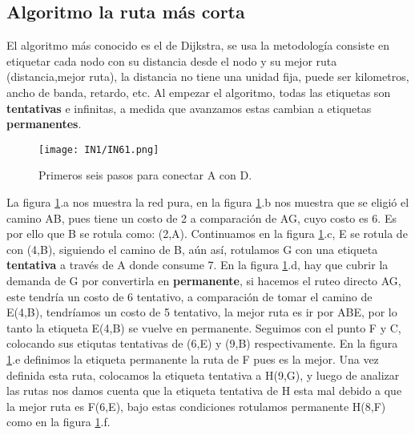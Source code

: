 \documentclass[
	12pt, %
	fleqn, %
	a4paper, %
]{LegrandOrangeBook}
\begin{document}
\subsection{Algoritmo la ruta más corta}
El algoritmo más conocido es el de Dijkstra, se usa la metodología consiste en etiquetar cada nodo con su distancia desde el nodo y su mejor ruta (distancia,mejor ruta), la distancia no tiene una unidad fija, puede ser kilometros, ancho de banda, retardo, etc. Al empezar el algoritmo, todas las etiquetas son \textbf{tentativas} e infinitas, a medida que avanzamos estas cambian a etiquetas \textbf{permanentes}.
\begin{figure}[H]
\centering
\texttt{[image: IN1/IN61.png]}
\caption{Primeros seis pasos para conectar A con D.}
\label{fig:algo dij}
\end{figure}
La figura \ref{fig:algo dij}.a nos muestra la red pura, en la figura \ref{fig:algo dij}.b nos muestra que se eligió el camino AB, pues tiene un costo de 2 a comparación de AG, cuyo costo es 6. Es por ello que B se rotula como: (2,A). Continuamos en la figura \ref{fig:algo dij}.c, E se rotula de con (4,B), siguiendo el camino de B, aún así, rotulamos G con una etiqueta \textbf{tentativa} a través de A donde consume 7. En la figura \ref{fig:algo dij}.d, hay que cubrir la demanda de G por convertirla en \textbf{permanente}, si hacemos el ruteo directo AG, este tendría un costo de 6 tentativo, a comparación de tomar el camino de E(4,B), tendríamos un costo de 5 tentativo, la mejor ruta es ir por ABE, por lo tanto la etiqueta E(4,B) se vuelve en permanente. Seguimos con el punto F y C, colocando sus etiqutas tentativas de (6,E) y (9,B) respectivamente. En la figura \ref{fig:algo dij}.e definimos la etiqueta permanente la ruta de F pues es la mejor. Una vez definida esta ruta, colocamos la etiqueta tentativa a H(9,G), y luego de analizar las rutas nos damos cuenta que la etiqueta tentativa de H esta mal debido a que la mejor ruta es F(6,E), bajo estas condiciones rotulamos permanente H(8,F) como en la figura \ref{fig:algo dij}.f.
\end{document}
